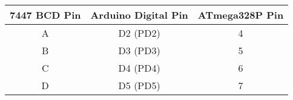 \begin{table}[h]
    \centering
    \begin{tabular}{|c|c|c|}
        \hline
        \textbf{7447 BCD Pin} & \textbf{Arduino Digital Pin} & \textbf{ATmega328P Pin} \\
        \hline
        A  & D2 (PD2)  & 4  \\
        B  & D3 (PD3)  & 5  \\
        C  & D4 (PD4)  & 6  \\
        D  & D5 (PD5)  & 7  \\
        \hline
    \end{tabular}
    \label{tab:bcd_pins}
\end{table}

